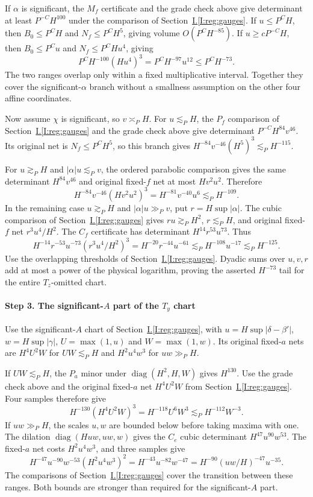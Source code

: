 \documentclass[11pt]{amsart}
\theoremstyle{definition}
\theoremstyle{remark}
\numberwithin{equation}{section}
\newcommand{\partIref}[1]{\hyperref[I:#1]{I.\ref*{I:#1}}}
\begin{document}
If $\alpha$ is significant, the $M_f$ certificate and the grade check above give determinant at least $P^{-C}H^{100}$ under the comparison of Section~\partIref{reg:gauges}. If $u\le P^CH$, then $B_0\le P^CH$ and $N_f\le P^CH^5$, giving volume $O(P^CH^{-85})$. If $u\ge cP^{-C}H$, then $B_0\le P^Cu$ and $N_f\le P^CHu^4$, giving
\[
P^CH^{-100}(Hu^4)^3=P^CH^{-97}u^{12}\le P^CH^{-73}.
\]
The two ranges overlap only within a fixed multiplicative interval. Together they cover the significant-$\alpha$ branch without a smallness assumption on the other four affine coordinates.

Now assume $\chi$ is significant, so $v\asymp_PH$. For $u\lesssim_PH$, the $P_f$ comparison of Section~\partIref{reg:gauges} and the grade check above give determinant $P^{-C}H^{84}v^{46}$. Its original net is $N_f\le P^CH^5$, so this branch gives $H^{-84}v^{-46}(H^5)^3\lesssim_PH^{-115}$.

For $u\gtrsim_PH$ and $|\alpha|u\lesssim_Pv$, the ordered parabolic comparison gives the same determinant $H^{84}v^{46}$ and original fixed-$f$ net at most $Hv^2u^2$. Therefore
\[
H^{-84}v^{-46}(Hv^2u^2)^3=H^{-81}v^{-40}u^6\lesssim_PH^{-109}.
\]
In the remaining case $u\gtrsim_PH$ and $|\alpha|u\gg_Pv$, put $r=H\sup|\alpha|$. The cubic comparison of Section~\partIref{reg:gauges} gives $ru\gtrsim_PH^2$, $r\lesssim_PH$, and original fixed-$f$ net $r^3u^4/H^2$. The $C_f$ certificate has determinant $H^{14}r^{53}u^{73}$. Thus
\[
H^{-14}r^{-53}u^{-73}(r^3u^4/H^2)^3=H^{-20}r^{-44}u^{-61}\lesssim_PH^{-108}u^{-17}\lesssim_PH^{-125}.
\]
Use the overlapping thresholds of Section~\partIref{reg:gauges}. Dyadic sums over $u,v,r$ add at most a power of the physical logarithm, proving the asserted $H^{-73}$ tail for the entire $T_z$-omitted chart.

\paragraph{Step 3. The significant-$A$ part of the $T_y$ chart}

Use the significant-$A$ chart of Section~\partIref{reg:gauges}, with $u=H\sup|\delta-\beta'|$, $w=H\sup|\gamma|$, $U=\max(1,u)$ and $W=\max(1,w)$. Its original fixed-$a$ nets are $H^4U^2W$ for $UW\lesssim_PH$ and $H^2u^4w^3$ for $uw\gg_PH$.

If $UW\lesssim_PH$, the $P_a$ minor under $\operatorname{diag}(H^2,H,W)$ gives $H^{130}$. Use the grade check above and the original fixed-$a$ net $H^4U^2W$ from Section~\partIref{reg:gauges}. Four samples therefore give
\[
H^{-130}(H^4U^2W)^3=H^{-118}U^6W^3\lesssim_PH^{-112}W^{-3}.
\]
If $uw\gg_PH$, the scales $u,w$ are bounded below before taking maxima with one. The dilation $\operatorname{diag}(Huw,uw,w)$ gives the $C_e$ cubic determinant $H^{47}u^{90}w^{53}$. The fixed-$a$ net costs $H^2u^4w^3$, and three samples give
\[
H^{-47}u^{-90}w^{-53}(H^2u^4w^3)^2=H^{-43}u^{-82}w^{-47}=H^{-90}(uw/H)^{-47}u^{-35}.
\]
The comparisons of Section~\partIref{reg:gauges} cover the transition between these ranges. Both bounds are stronger than required for the significant-$A$ part.
\end{document}
